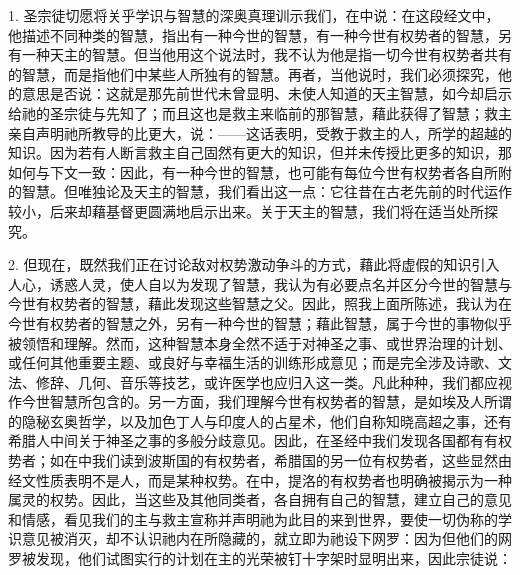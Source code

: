 1. 圣宗徒切愿将关乎学识与智慧的深奥真理训示我们，在中说：在这段经文中，他描述不同种类的智慧，指出有一种今世的智慧，有一种今世有权势者的智慧，另有一种天主的智慧。但当他用这个说法时，我不认为他是指一切今世有权势者共有的智慧，而是指他们中某些人所独有的智慧。再者，当他说时，我们必须探究，他的意思是否说：这就是那先前世代未曾显明、未使人知道的天主智慧，如今却启示给祂的圣宗徒与先知了；而且这也是救主来临前的那智慧，藉此获得了智慧；救主亲自声明祂所教导的比更大，说：——这话表明，受教于救主的人，所学的超越的知识。因为若有人断言救主自己固然有更大的知识，但并未传授比更多的知识，那如何与下文一致：因此，有一种今世的智慧，也可能有每位今世有权势者各自所附的智慧。但唯独论及天主的智慧，我们看出这一点：它往昔在古老先前的时代运作较小，后来却藉基督更圆满地启示出来。关于天主的智慧，我们将在适当处所探究。\par

2. 但现在，既然我们正在讨论敌对权势激动争斗的方式，藉此将虚假的知识引入人心，诱惑人灵，使人自以为发现了智慧，我认为有必要点名并区分今世的智慧与今世有权势者的智慧，藉此发现这些智慧之父。因此，照我上面所陈述，我认为在今世有权势者的智慧之外，另有一种今世的智慧；藉此智慧，属于今世的事物似乎被领悟和理解。然而，这种智慧本身全然不适于对神圣之事、或世界治理的计划、或任何其他重要主题、或良好与幸福生活的训练形成意见；而是完全涉及诗歌、文法、修辞、几何、音乐等技艺，或许医学也应归入这一类。凡此种种，我们都应视作今世智慧所包含的。另一方面，我们理解今世有权势者的智慧，是如埃及人所谓的隐秘玄奥哲学，以及加色丁人与印度人的占星术，他们自称知晓高超之事，还有希腊人中间关于神圣之事的多般分歧意见。因此，在圣经中我们发现各国都有有权势者；如在中我们读到波斯国的有权势者，希腊国的另一位有权势者，这些显然由经文性质表明不是人，而是某种权势。在中，提洛的有权势者也明确被揭示为一种属灵的权势。因此，当这些及其他同类者，各自拥有自己的智慧，建立自己的意见和情感，看见我们的主与救主宣称并声明祂为此目的来到世界，要使一切伪称的学识意见被消灭，却不认识祂内在所隐藏的，就立即为祂设下网罗：因为但他们的网罗被发现，他们试图实行的计划在主的光荣被钉十字架时显明出来，因此宗徒说：\par

